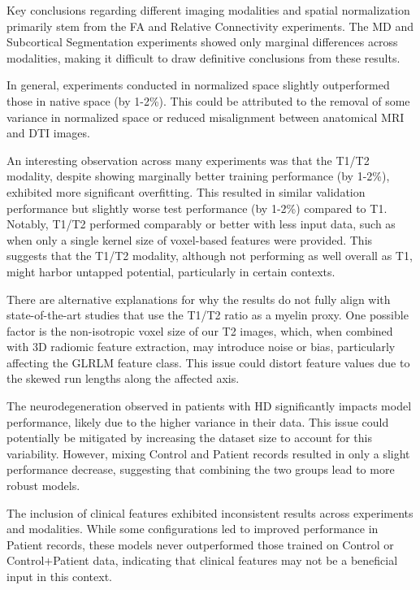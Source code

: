Key conclusions regarding different imaging modalities and spatial normalization primarily stem from the \ac{FA} and Relative Connectivity experiments. The \ac{MD} and Subcortical Segmentation experiments showed only marginal differences across modalities, making it difficult to draw definitive conclusions from these results.\par
In general, experiments conducted in normalized space slightly outperformed those in native space (by 1-2\%). This could be attributed to the removal of some variance in normalized space or reduced misalignment between anatomical \ac{MRI} and \ac{DTI} images.\par
An interesting observation across many experiments was that the T1/T2 modality, despite showing marginally better training performance (by 1-2\%), exhibited more significant overfitting. This resulted in similar validation performance but slightly worse test performance (by 1-2\%) compared to T1. Notably, T1/T2 performed comparably or better with less input data, such as when only a single kernel size of voxel-based features were provided. This suggests that the T1/T2 modality, although not performing as well overall as T1, might harbor untapped potential, particularly in certain contexts.\par
There are alternative explanations for why the results do not fully align with state-of-the-art studies that use the T1/T2 ratio as a myelin proxy. One possible factor is the non-isotropic voxel size of our T2 images, which, when combined with 3D radiomic feature extraction, may introduce noise or bias, particularly affecting the \ac{GLRLM} feature class. This issue could distort feature values due to the skewed run lengths along the affected axis.\par
The neurodegeneration observed in patients with \ac{HD} significantly impacts model performance, likely due to the higher variance in their data. This issue could potentially be mitigated by increasing the dataset size to account for this variability. However, mixing Control and Patient records resulted in only a slight performance decrease, suggesting that combining the two groups lead to more robust models.\par
The inclusion of clinical features exhibited inconsistent results across experiments and modalities. While some configurations led to improved performance in Patient records, these models never outperformed those trained on Control or Control+Patient data, indicating that clinical features may not be a beneficial input in this context.\par
